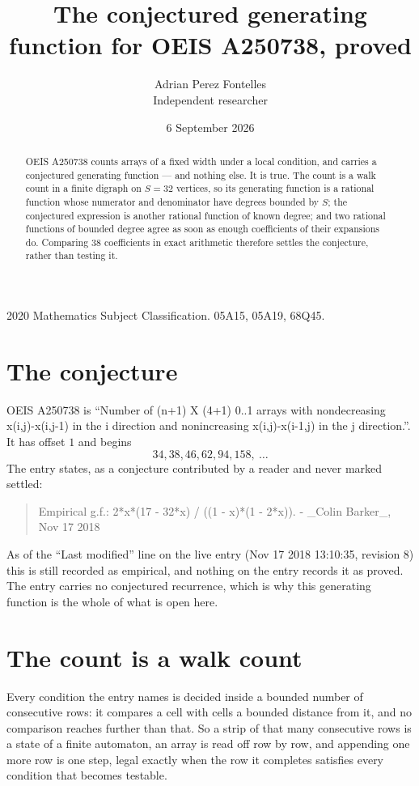 \documentclass[11pt,a4paper]{article}
\title{The conjectured generating function for OEIS A250738, proved}
\author{Adrian Perez Fontelles\\ \small Independent researcher}
\date{6 September 2026}
\theoremstyle{plain}
\theoremstyle{definition}
\begin{document}
\maketitle

\begin{abstract}
OEIS A250738 counts arrays of a fixed width under a local condition, and carries a conjectured
generating function --- and nothing else. It is true. The count is a walk count in a finite
digraph on $S=32$ vertices, so its generating function is a rational function whose numerator
and denominator have degrees bounded by $S$; the conjectured expression is another rational
function of known degree; and two rational functions of bounded degree agree as soon as enough
coefficients of their expansions do. Comparing $38$ coefficients in exact arithmetic
therefore settles the conjecture, rather than testing it.
\end{abstract}

\noindent\small 2020 Mathematics Subject Classification. 05A15, 05A19, 68Q45.\normalsize

\section{The conjecture}

OEIS A250738 is ``Number of (n+1) X (4+1) 0..1 arrays with nondecreasing x(i,j)-x(i,j-1) in the i direction and nonincreasing x(i,j)-x(i-1,j) in the j direction.''. It has offset $1$ and begins
\[
34, 38, 46, 62, 94, 158,\ \dots
\]
The entry states, as a conjecture contributed by a reader and never marked settled:
\begin{quote}
Empirical g.f.: 2*x*(17 - 32*x) /  ((1 - x)*(1 - 2*x)). - \_Colin Barker\_, Nov 17 2018
\end{quote}
As of the ``Last modified'' line on the live entry (Nov 17 2018 13:10:35, revision 8) this is still
recorded as empirical, and nothing on the entry records it as proved. The entry carries no
conjectured recurrence, which is why this generating function is the whole of what is open
here.

\section{The count is a walk count}

Every condition the entry names is decided inside a bounded number of consecutive rows: it
compares a cell with cells a bounded distance from it, and no comparison reaches further than
that. So a strip of that many consecutive rows is a state of a finite automaton, an array is
read off row by row, and appending one more row is one step, legal exactly when the row it
completes satisfies every condition that becomes testable.
\end{document}
